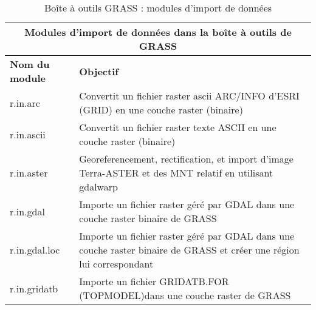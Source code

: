 \begin{table}[ht]
\centering
\caption{Bo\^ite \`a outils GRASS : modules d'import de donn\'ees}\medskip
 \begin{tabular}{|p{4cm}|p{12cm}|}
  \hline \multicolumn{2}{|c|}{\textbf{Modules d'import de donn\'ees dans la bo\^ite \`a outils de GRASS}} \\ 
  \hline \textbf{Nom du module} & \textbf{Objectif} \\
  \hline r.in.arc & Convertit un fichier raster ascii ARC/INFO d'ESRI (GRID) en une couche raster (binaire) \\
  \hline r.in.ascii & Convertit un fichier raster texte ASCII en une couche raster (binaire)\\
  \hline r.in.aster & Georeferencement, rectification, et import d'image Terra-ASTER et des MNT relatif en utilisant gdalwarp \\
  \hline r.in.gdal &  Importe un fichier raster g\'er\'e par GDAL dans une couche raster binaire de GRASS\\
  \hline r.in.gdal.loc &  Importe un fichier raster g\'er\'e par GDAL dans une couche raster binaire de GRASS et cr\'eer une r\'egion lui correspondant\\
  \hline r.in.gridatb & Importe un fichier GRIDATB.FOR (TOPMODEL)dans une couche raster de GRASS\\

\end{tabular}
\end{table}
